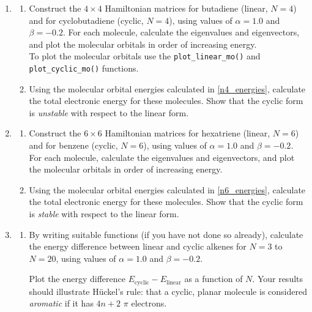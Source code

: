 \documentclass[a4paper]{article}
\begin{document}
\begin{enumerate}
\begin{enumerate}
  \end{enumerate}
  \item
  \begin{enumerate}
    \item \label{n4_energies}Construct the $4\times4$ Hamiltonian matrices for butadiene (linear, $N=4$) and for cyclobutadiene (cyclic, $N=4$), using values of $\alpha=1.0$ and $\beta=-0.2$. For each molecule, calculate the eigenvalues and eigenvectors, and plot the molecular orbitals in order of increasing energy. \\ To plot the molecular orbitals use the \texttt{plot\_linear\_mo()}  and \texttt{plot\_cyclic\_mo()} functions.
    \item Using the molecular orbital energies calculated in \ref{n4_energies}, calculate the total electronic energy for these molecules. Show that the cyclic form is \emph{unstable} with respect to the linear form.
  \end{enumerate}
  \item
  \begin{enumerate}
    \item \label{n6_energies}Construct the $6\times6$ Hamiltonian matrices for hexatriene (linear, $N=6$) and for benzene (cyclic, $N=6$), using values of $\alpha=1.0$ and $\beta=-0.2$. For each molecule, calculate the eigenvalues and eigenvectors, and plot the molecular orbitals in order of increasing energy.
    \item Using the molecular orbital energies calculated in \ref{n6_energies}, calculate the total electronic energy for these molecules. Show that the cyclic form is \emph{stable} with respect to the linear form.
  \end{enumerate}
  \item
  \begin{enumerate}
    \item By writing suitable functions (if you have not done so already), calculate the energy difference between linear and cyclic alkenes for $N=3$ to $N=20$, using values of $\alpha=1.0$ and $\beta=-0.2$.

    Plot the energy difference $E_\mathrm{cyclic}-E_\mathrm{linear}$ as a function of $N$. Your results should illustrate H\"{u}ckel's rule: that a cyclic, planar molecule is considered \emph{aromatic} if it has $4n+2$ $\pi$ electrons. 
  \end{enumerate}
\end{enumerate}
\end{document}

